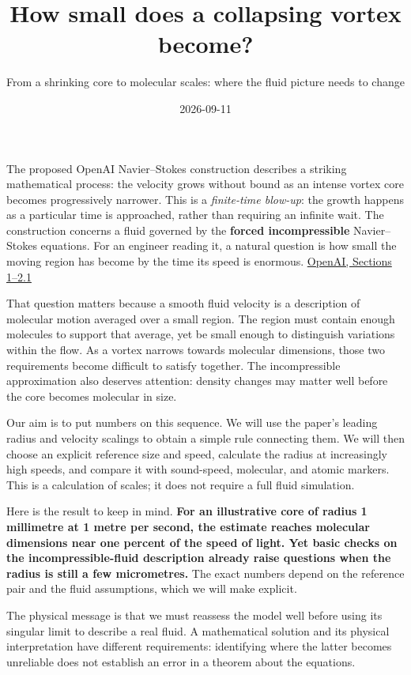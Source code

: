 \documentclass[
  english,
  11pt,
]{article}
\title{How small does a collapsing vortex become?}
\subtitle{From a shrinking core to molecular scales: where the fluid
picture needs to change}
\author{}
\date{2026-09-11}
\begin{document}
\maketitle


The proposed OpenAI Navier--Stokes construction describes a striking
mathematical process: the velocity grows without bound as an intense
vortex core becomes progressively narrower. This is a \emph{finite-time
blow-up}: the growth happens as a particular time is approached, rather
than requiring an infinite wait. The construction concerns a fluid
governed by the \textbf{forced incompressible} Navier--Stokes equations.
For an engineer reading it, a natural question is how small the moving
region has become by the time its speed is enormous.
\href{https://cdn.openai.com/pdf/32d9f210-8b73-45e0-91bc-82a30aef8a9a/navier-stokes.pdf}{OpenAI,
Sections 1--2.1}

That question matters because a smooth fluid velocity is a description
of molecular motion averaged over a small region. The region must
contain enough molecules to support that average, yet be small enough to
distinguish variations within the flow. As a vortex narrows towards
molecular dimensions, those two requirements become difficult to satisfy
together. The incompressible approximation also deserves attention:
density changes may matter well before the core becomes molecular in
size.

Our aim is to put numbers on this sequence. We will use the paper's
leading radius and velocity scalings to obtain a simple rule connecting
them. We will then choose an explicit reference size and speed,
calculate the radius at increasingly high speeds, and compare it with
sound-speed, molecular, and atomic markers. This is a calculation of
scales; it does not require a full fluid simulation.

Here is the result to keep in mind. \textbf{For an illustrative core of
radius 1 millimetre at 1 metre per second, the estimate reaches
molecular dimensions near one percent of the speed of light. Yet basic
checks on the incompressible-fluid description already raise questions
when the radius is still a few micrometres.} The exact numbers depend on
the reference pair and the fluid assumptions, which we will make
explicit.

The physical message is that we must reassess the model well before
using its singular limit to describe a real fluid. A mathematical
solution and its physical interpretation have different requirements:
identifying where the latter becomes unreliable does not establish an
error in a theorem about the equations.
\end{document}
